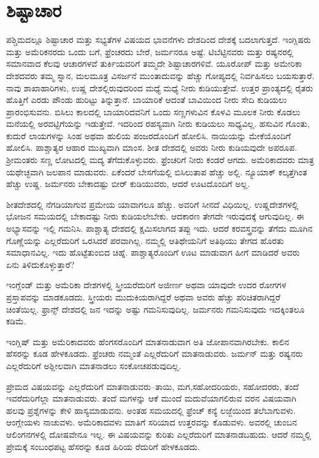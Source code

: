 \newpage

\section*{ಶಿಷ್ಟಾಚಾರ}

ಪಶ್ಚಿಮದಲ್ಲೂ ಶಿಷ್ಟಾಚಾರ ಮತ್ತು ಸಭ್ಯತೆಗಳ ವಿಷಯದ ಭಾವನೆಗಳು ದೇಶದಿಂದ ದೇಶಕ್ಕೆ ಬದಲಾಗುತ್ತದೆ. ಇಂಗ್ಲಿಷರು ಮತ್ತು ಅಮೆರಿಕನರದು ಒಂದು ಬಗೆ, ಫ್ರೆಂಚರದು ಬೇರೆ, ಜರ್ಮನರೂ ಅಷ್ಟೆ. ಟಿಬೆಟ್ಟಿನವರು ಮತ್ತು ರಷ್ಯನರಲ್ಲಿ ಸಮಾನವಾದ ಕೆಲವು ಆಚಾರಗಳವೆ ತುರ್ಕಿಯವರಿಗೆ ತಮ್ಮದೇ ಶಿಷ್ಟಾಚಾರಗಳಿವೆ. ಯೂರೋಪ್​ ಮತ್ತು ಅಮೇರಿಕಾ ದೇಶದವರು ತಮ್ಮ ಸ್ನಾನ, ಮಲಮೂತ್ರ ವಿಸರ್ಜನೆ ಮುಂತಾದುವನ್ನು ಹೆಚ್ಚು ಗೋಪ್ಯದಲ್ಲಿ ನಿರ್ವಹಿಸಲು ಬಯಸುತ್ತಾರೆ. ನಾವು ಶಾಖಾಹಾರಿಗಳು, ಉಷ್ಣ ದೇಶಲ್ಲಿರುವುದರಿಂದ ಮಧ್ಯೆ ಮಧ್ಯೆ ನೀರು ಕುಡಿಯುತ್ತೇವೆ. ಉತ್ತರ ಪ್ರಾಂತ್ಯದಲ್ಲಿ ರೈತರು ಹೊತ್ತಿಗೆ ಎರಡು ಪೌಂಡು ಹುರಿಟ್ಟು ತಿನ್ನುತ್ತಾನೆ. ಬಾಯಾರಿಕೆ ಆದಂತೆ ಬಾವಿಯಿಂದ ನೀರು ಸೇದಿ ಕುಡಿಯಲು ಪ್ರಾರಂಭಿಸುವನು. ಬಿಸಿಲು ಕಾಲದಲ್ಲಿ ಬಾಯಾರಿದವನಿಗೆ ಒಂದು ಸಣ್ಣಗಳುವಿನ ಕೊಳವಿ ಮೂಲಕ ನೀರು ಕೊಡಲು ಮನೆಯಲ್ಲಿ ಅರವಟ್ಟಿಗೆಯನ್ನು ಇಡುತ್ತೇವೆ. ಇದರಿಂದ ರಹಸ್ಯವಾಗಿ ನೀರು ಕುಡಿಯಲು ಸಾಧ್ಯವಿಲ್ಲ. ಹಸುವಿನ ಗೊಂತು, ಕುದುರೆ ಲಾಯಗಳನ್ನು ಸಿಂಹ ಅಥವಾ ಹುಲಿಯ ಪಂಜರದೊಂದಿಗೆ ಹೋಲಿಸಿ. ನಾಯಿಯನ್ನು ಮೇಕೆಯೊಂದಿಗೆ ಹೋಲಿಸಿ. ಪಾಶ್ಚಾತ್ಯರ ಆಹಾರ ಮುಖ್ಯವಾಗಿ ಮಾಂಸ. ಶೀತ ದೇಶದಲ್ಲಿ ಅವರು ನೀರು ಕುಡಿಯವುದೇ ಅಪರೂಪ. ಶ‍್ರೀಮಂತರು ಸಣ್ಣ ಲೋಟದಲ್ಲಿ ಮದ್ಯ ತೆಗೆದುಕೊಳ್ಳುವರು. ಫ್ರೆಂಚರಿಗೆ ನೀರು ಕಂಡರೆ ಆಗದು. ಅಮೆರಿಕಾದವರು ಮಾತ್ರ ಯಥೇಚ್ಛವಾಗಿ ಜಲಪಾನ ಮಾಡುವರು. ಏಕೆಂದರೆ ಬೇಸಗೆಯಲ್ಲಿ ಬಿಸಿಲುತಾಪ ಹೆಚ್ಚು ಅಲ್ಲಿ. ನ್ಯೂಯಾಕ್​ ಕಲ್ಕತ್ತೆಗಿಂತ ಹೆಚ್ಚು ಉಷ್ಣ. ಜರ್ಮನರು ಬೇಕಾದಷ್ಟು ಬೀರ್​ ಕುಡಿಯುವರು, ಆದರೆ ಊಟದೊಂದಿಗೆ ಅಲ್ಲ.

ಶೀತದೇಶದಲ್ಲಿ ನೆಗಡಿಯಾಗುವ ಪ್ರಮೇಯ ಯಾವಾಗಲೂ ಹೆಚ್ಚು. ಅವರಿಗೆ ಸೀನದೆ ವಿಧಿಯಿಲ್ಲ. ಉಷ್ಣದೇಶಗಳಲ್ಲಿ ಭೋಜನ ಸಮಯದಲ್ಲಿ ಬೇಕಾದಷ್ಟು ನೀರು ಕುಡಿಯಲೇ\break ಬೇಕು. ಆದಕಾರಣ ತೇಗದೇ ಇರುವುದಕ್ಕೆ ಆಗುವುದಿಲ್ಲ. ಈ ಅಭ್ಯಾಸವನ್ನು ಇಲ್ಲಿ ಗಮನಿಸಿ. ಪಾಶ್ಚಾತ್ಯ ದೇಶದಲ್ಲಿ ಕ್ಷಮಿಸಲಾಗದ ತಪ್ಪು ಇದು. ಆದರೆ ಕರವಸ್ತ್ರವನ್ನು ತೆಗೆದು ಮೂಗಿನ ಗೊಣ್ಣೆಯನ್ನು ಎಲ್ಲರೆದುರಿಗೆ ಒರಸಿದರೆ ಪರವಾಗಿಲ್ಲ. ನಮ್ಮಲ್ಲಿ ಆತಿಥೇಯನಿಗೆ ಅತಿಥಿಯು ತೇಗದ ಹೊರತು ಸಮಾಧಾನವಿಲ್ಲ. ಇದು ಹೊಟ್ಟೆತುಂಬಿದ ಚಿಹ್ನೆ. ಪಾಶ್ಚಾತ್ಯರೊಂದಿಗೆ ಊಟ ಮಾಡುವಾಗ ಹೀಗೆ ಮಾಡಿದರೆ ಅವರು ಏನು ತಿಳಿದುಕೊಳ್ಳುತ್ತಾರೆ?

ಇಂಗ್ಲೆಂಡ್​ ಮತ್ತು ಅಮೆರಿಕಾ ದೇಶಗಳಲ್ಲಿ ಸ್ತ್ರೀಯರೆದುರಿಗೆ ಅಜೀರ್ಣ ಅಥವಾ ಯಾವುದೇ ಉದರ ರೋಗಗಳ ಪ್ರಸ್ತಾಪವನ್ನು ಮಾಡಕೂಡದು. ಸ್ತ್ರೀಯರು ಮುದುಕಿಯ\break ರಾಗಿದ್ದರೆ ಅಥವಾ ಅವರು ಹೆಚ್ಚು ಪರಿಚಿತರಾಗಿದ್ದರೆ ಚಿಂತೆಯಿಲ್ಲ. ಫ್ರಾನ್ಸ್​ ದೇಶದಲ್ಲಿ ಜನ ಇದನ್ನು ಅಷ್ಟು ಗಮನಿಸುವುದಿಲ್ಲ. ಜರ್ಮನರು ಗಮನಿಸುವುದು ಇದಕ್ಕಿಂತಲೂ ಕಡಿಮೆ.

ಇಂಗ್ಲಿಷ್​ ಮತ್ತು ಅಮೆರಿಕಾದವರು ಹೆಂಗಸರೊಂದಿಗೆ ಮಾತನಾಡುವಾಗ ಅತಿ ಜೋಪಾನವಾಗಿರಬೇಕು. ಕಾಲಿನ ಹೆಸರನ್ನು ಕೂಡ ಹೇಳಕೂಡದು. ಫ್ರೆಂಚರು ನಮ್ಮಂತೆ ಎಲ್ಲರೆದುರಿಗೆ ಮಾತನಾಡುವರು. ಜರ್ಮನ್​ ಮತ್ತು ರಷ್ಯನರು ಎಲ್ಲರೆದುರಿಗೆ ಅಶ್ಲೀಲವಾಗಿ ಮಾತನಾಡಲು ಸಂಕೋಚಪಡುವುದಿಲ್ಲ.

ಪ್ರೇಮದ ವಿಷಯವನ್ನು ಎಲ್ಲರೆದುರಿಗೆ ಮಾತನಾಡುವರು–ತಾಯಿ, ಮಗ,\break ಸಹೋದರಿಯರು, ಸಹೋದರರು, ತಂದೆ ಇವರೆದುರಿಗೆಲ್ಲಾ ಮಾತನಾಡುವರು. ತಂದೆ ಮಗಳನ್ನು ಆಕೆ ಮುಂದೆ ಮದುವೆಯಾಗಲಿರುವ ವರನ ವಿಷಯವಾಗಿ ಹಲವು ಪ್ರಶ್ನೆಗಳನ್ನು ಕೇಳಿ ಹಾಸ್ಯಮಾಡುವನು. ಅಂತಹ ಸಮಯದಲ್ಲಿ ಫ್ರೆಂಚ್​ ಕನ್ಯೆ ಲಜ್ಜೆಯಿಂದ ತಲೆಬಾಗುವಳು. ಆಂಗ್ಲೇಯಳು ನಾಚುವಳು. ಅಮೆರಿಕಾದವಳು ಮಾತಿಗೆ ಸರಿಯಾದ ಉತ್ತರವನ್ನು ಕೊಡುವಳು. ಅವರಲ್ಲಿ ಚುಂಬನ ಆಲಿಂಗನಗಳಲ್ಲಿ ದೋಷವೇನೂ ಇಲ್ಲ. ಈ ವಿಷಯವನ್ನು ಕುರಿತು ಎಲ್ಲರೆದುರಿಗೆ ಮಾತನಾಡಬಹುದು. ಆದರೆ ನಮ್ಮಲ್ಲಿ ಪ್ರೇಮಕ್ಕೆ ಸಂಬಂಧಪಟ್ಟ ಹೆಸರನ್ನು ಕೂಡ ಹಿರಿಯ ರೆದುರಿಗೆ ಹೇಳಕೂಡದು.

